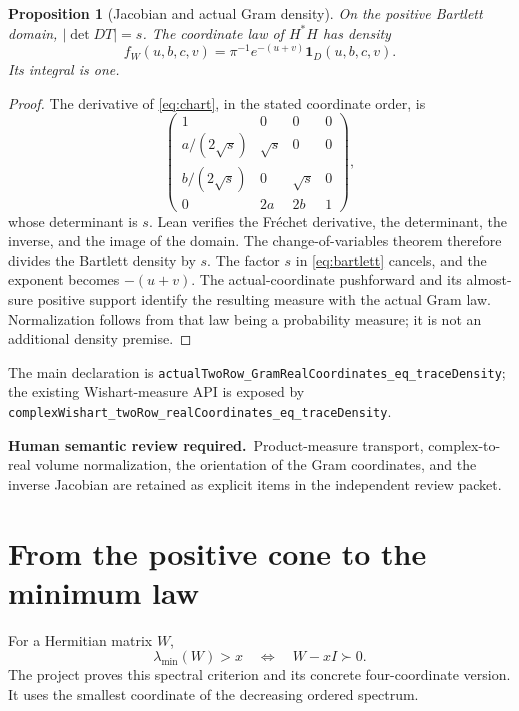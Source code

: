 \documentclass[11pt]{article}
\newtheorem{proposition}[theorem]{Proposition}
\newcommand{\pd}{\succ0}
\newcommand{\lean}[1]{{\small\nolinkurl{#1}}}
\newcommand{\review}{\par\smallskip\noindent\textbf{Human semantic review required.}\ }
\begin{document}
\begin{proposition}[Jacobian and actual Gram density]\label{thm:gram}
On the positive Bartlett domain, $|\det DT|=s$. The coordinate law of $H^*H$
has density
\begin{equation}\label{eq:gram}
 f_W(u,b,c,v)=\pi^{-1}e^{-(u+v)}\mathbf1_D(u,b,c,v).
\end{equation}
Its integral is one.
\end{proposition}
\begin{proof}
The derivative of \eqref{eq:chart}, in the stated coordinate order, is
\[
 \begin{pmatrix}
 1&0&0&0\\
 a/(2\sqrt s)&\sqrt s&0&0\\
 b/(2\sqrt s)&0&\sqrt s&0\\
 0&2a&2b&1
 \end{pmatrix},
\]
whose determinant is $s$. Lean verifies the Fr\'echet derivative, the determinant,
the inverse, and the image of the domain. The change-of-variables theorem
therefore divides the Bartlett density by $s$. The factor $s$ in
\eqref{eq:bartlett} cancels, and the exponent becomes $-(u+v)$.
The actual-coordinate pushforward and its almost-sure positive support identify
the resulting measure with the actual Gram law. Normalization follows from
that law being a probability measure; it is not an additional density premise.
\end{proof}

The main declaration is
\lean{actualTwoRow_GramRealCoordinates_eq_traceDensity}; the existing
Wishart-measure API is exposed by
\lean{complexWishart_twoRow_realCoordinates_eq_traceDensity}.
\review Product-measure transport, complex-to-real volume normalization,
the orientation of the Gram coordinates, and the inverse Jacobian are retained
as explicit items in the independent review packet.

\section{From the positive cone to the minimum law}\label{sec:minimum}
For a Hermitian matrix $W$,
\begin{equation}\label{eq:threshold}
 \lambda_{\min}(W)>x\quad\Longleftrightarrow\quad W-xI\pd.
\end{equation}
The project proves this spectral criterion and its concrete four-coordinate
version. It uses the smallest coordinate of the decreasing ordered spectrum.
\end{document}
